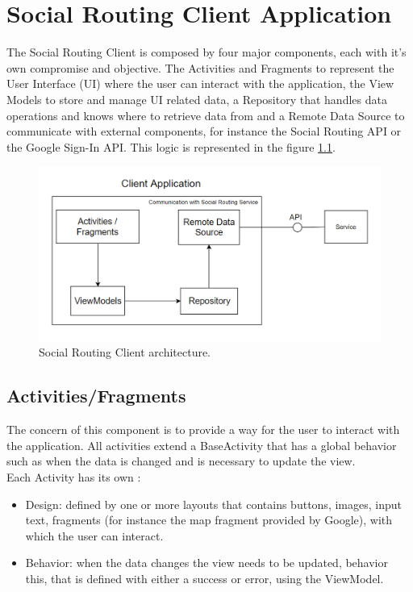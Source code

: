 \chapter{Social Routing Client Application}
The Social Routing Client is composed by four major components, each with it's own compromise and objective.
The Activities\cite{activities} and Fragments\cite{fragments} to represent the User Interface (UI) where the user can interact with
the application, the View Models\cite{viewmodel} to store
and manage UI related data, a Repository that handles data operations and knows where to retrieve data from and a 
Remote Data Source to communicate with external components, for instance the Social Routing API or the Google Sign-In API\cite{googlesignindocs}. 
This logic is represented in the figure \ref{fig:clientarchitecture}.

\begin{figure}[h]            
        \includegraphics[width=\textwidth]{images/project-structure/social-routing-client-application-structure.PNG}
        \caption{Social Routing Client architecture.}
        \label{fig:clientarchitecture}
\end{figure}
\newpage
\section*{Activities/Fragments}
The concern of this component is to provide a way for the user to interact with the application.
All activities extend a BaseActivity that has a global behavior such as when the data is changed and is necessary to update the view.\\

Each Activity has its own :
\begin{itemize}
        \item Design: defined by one or more layouts that contains buttons, images, input text, fragments (for instance the map fragment provided by Google), with which the user can interact.
        \item Behavior: when the data changes the view needs to be updated, behavior this, that is defined with either a success or error, using the ViewModel.
\end{itemize}

